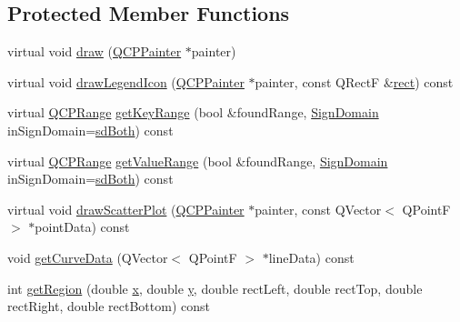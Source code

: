 \subsection*{Protected Member Functions}
\begin{DoxyCompactItemize}
\item 
virtual void \hyperlink{class_q_c_p_curve_a2361302d2fc6ec669849bd3bca00c4b2}{draw} (\hyperlink{class_q_c_p_painter}{Q\+C\+P\+Painter} $\ast$painter)
\item 
virtual void \hyperlink{class_q_c_p_curve_aaee24451e0044d1debfa1fee92c58d7b}{draw\+Legend\+Icon} (\hyperlink{class_q_c_p_painter}{Q\+C\+P\+Painter} $\ast$painter, const Q\+Rect\+F \&\hyperlink{_gen_blob_8m_aea8f6815d9a63491fc422c5572c6b3c3}{rect}) const 
\item 
virtual \hyperlink{class_q_c_p_range}{Q\+C\+P\+Range} \hyperlink{class_q_c_p_curve_ad6a9559e16ab43586df18ae376d54481}{get\+Key\+Range} (bool \&found\+Range, \hyperlink{class_q_c_p_abstract_plottable_a661743478a1d3c09d28ec2711d7653d8}{Sign\+Domain} in\+Sign\+Domain=\hyperlink{class_q_c_p_abstract_plottable_a661743478a1d3c09d28ec2711d7653d8a082b98cfb91a7363a3b5cd17b0c1cd60}{sd\+Both}) const 
\item 
virtual \hyperlink{class_q_c_p_range}{Q\+C\+P\+Range} \hyperlink{class_q_c_p_curve_a1d6eec81aab9ae6182bb7c040bcb2dbc}{get\+Value\+Range} (bool \&found\+Range, \hyperlink{class_q_c_p_abstract_plottable_a661743478a1d3c09d28ec2711d7653d8}{Sign\+Domain} in\+Sign\+Domain=\hyperlink{class_q_c_p_abstract_plottable_a661743478a1d3c09d28ec2711d7653d8a082b98cfb91a7363a3b5cd17b0c1cd60}{sd\+Both}) const 
\item 
virtual void \hyperlink{class_q_c_p_curve_a45593f30b81beec4b6130b6b53306087}{draw\+Scatter\+Plot} (\hyperlink{class_q_c_p_painter}{Q\+C\+P\+Painter} $\ast$painter, const Q\+Vector$<$ Q\+Point\+F $>$ $\ast$point\+Data) const 
\item 
void \hyperlink{class_q_c_p_curve_afa895f8ba9ae34fea6ecea295fd7b1e5}{get\+Curve\+Data} (Q\+Vector$<$ Q\+Point\+F $>$ $\ast$line\+Data) const 
\item 
int \hyperlink{class_q_c_p_curve_a3af3183f35bd7aebe149f29ae4f1034a}{get\+Region} (double \hyperlink{_v_s_a___u_t_2_comparision_pictures_2_createtest_image_8m_a9336ebf25087d91c818ee6e9ec29f8c1}{x}, double \hyperlink{_v_s_a___u_t_2_comparision_pictures_2_createtest_image_8m_a2fb1c5cf58867b5bbc9a1b145a86f3a0}{y}, double rect\+Left, double rect\+Top, double rect\+Right, double rect\+Bottom) const 
\item 

\end{DoxyCompactItemize}
